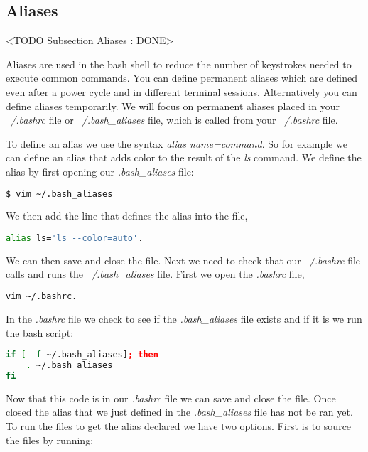 \subsection{Aliases}
	<TODO Subsection Aliases : DONE>
	
Aliases are used in the bash shell to reduce the number of keystrokes needed to execute common commands. You can define permanent aliases which are defined even after a power cycle and in different terminal sessions. Alternatively you can define aliases temporarily. We will focus on permanent aliases placed in your \emph{~/.bashrc} file or \emph{~/.bash\_aliases} file, which is called from your \emph{~/.bashrc} file. 

To define an alias we use the syntax \emph{alias name=command}. So for example we can define an alias that adds color to the result of the \emph{ls} command. We define the alias by first opening our \emph{.bash\_aliases} file:

\begin{lstlisting}[language=bash]
	$ vim ~/.bash_aliases
\end{lstlisting}

We then add the line that defines the alias into the file,

\begin{lstlisting}[language=bash]
alias ls='ls --color=auto'.
\end{lstlisting}

We can then save and close the file. Next we need to check that our \emph{~/.bashrc} file calls and runs the \emph{~/.bash\_aliases} file. First we open the \emph{.bashrc} file,

\begin{lstlisting}[language=bash]
vim ~/.bashrc.
\end{lstlisting}

In the \emph{.bashrc} file we check to see if the \emph{.bash\_aliases} file exists and if it is we run the bash script:

\begin{lstlisting}[language=bash]
if [ -f ~/.bash_aliases]; then
	. ~/.bash_aliases
fi
\end{lstlisting}

Now that this code is in our \emph{.bashrc} file we can save and close the file. Once closed the alias that we just defined in the \emph{.bash\_aliases} file has not be ran yet. To run the files to get the alias declared we have two options. First is to source the files by running:

